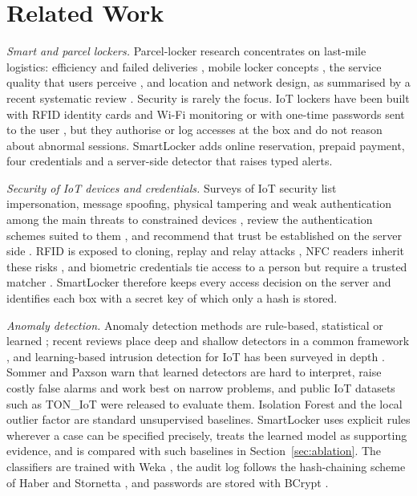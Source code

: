 \section{Related Work}\label{sec:related}

\textit{Smart and parcel lockers.} Parcel-locker research concentrates on last-mile logistics: efficiency and
failed deliveries \cite{iwan2016parcel}, mobile locker concepts \cite{schwerdfeger2022locker}, the service quality that
users perceive \cite{ciesla2023parcel}, and location and network design, as summarised by a recent systematic review
\cite{zhang2025parcel}. Security is rarely the focus. IoT lockers have been built with RFID identity cards and Wi-Fi
monitoring \cite{rfidiot2023locker} or with one-time passwords sent to the user \cite{paneru2023locker}, but they
authorise or log accesses at the box and do not reason about abnormal sessions. SmartLocker adds online reservation,
prepaid payment, four credentials and a server-side detector that raises typed alerts.

\textit{Security of IoT devices and credentials.} Surveys of IoT security list impersonation, message spoofing,
physical tampering and weak authentication among the main threats to constrained devices
\cite{abomhara2015cyber, neshenko2019demystifying, hassija2019survey}, review the authentication schemes suited to them
\cite{elhajj2019survey}, and recommend that trust be established on the server side
\cite{sicari2015security, roman2013features}. RFID \cite{want2006rfid} is exposed to cloning, replay and relay attacks
\cite{mitrokotsa2010rfid}, NFC readers inherit these risks \cite{coskun2013nfc}, and biometric credentials tie access to
a person but require a trusted matcher \cite{jain2004biometric}. SmartLocker therefore keeps every access decision on
the server and identifies each box with a secret key of which only a hash is stored.

\textit{Anomaly detection.} Anomaly detection methods are rule-based, statistical or learned
\cite{chandola2009anomaly, ahmed2016survey}; recent reviews place deep and shallow detectors in a common framework
\cite{ruff2021unifying, pang2021deep}, and learning-based intrusion detection for IoT has been surveyed in depth
\cite{chaabouni2019network}. Sommer and Paxson \cite{sommer2010outside} warn that learned detectors are hard to
interpret, raise costly false alarms and work best on narrow problems, and public IoT datasets such as TON\_IoT
\cite{moustafa2021toniot} were released to evaluate them. Isolation Forest \cite{liu2008isolation} and the local
outlier factor \cite{breunig2000lof} are standard unsupervised baselines. SmartLocker uses explicit rules wherever a case
can be specified precisely, treats the learned model as supporting evidence, and is compared with such baselines in
Section~\ref{sec:ablation}. The classifiers are trained with Weka \cite{hall2009weka}, the audit log follows the
hash-chaining scheme of Haber and Stornetta \cite{haber1991timestamp}, and passwords are stored with BCrypt
\cite{provos1999bcrypt}.

